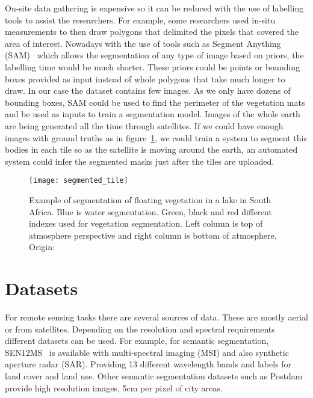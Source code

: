\documentclass[conference]{IEEEtran}
\begin{document}
    On-site data gathering is expensive so it can be reduced with the use of labelling tools to assist the researchers.
    For example, some researchers used in-situ measurements to then draw polygons that delimited the pixels that covered the area of interest.
    Nowadays with the use of tools such as Segment Anything (SAM)~\cite{kirillov2023segment} which allows the segmentation of any type of image based on priors, the labelling time would be much shorter.
    These priors could be points or bounding boxes provided as input instead of whole polygons that take much longer to draw.
    In our case the dataset contains few images.
    As we only have dozens of bounding boxes, SAM could be used to find the perimeter of the vegetation mats and be used as inputs to train a segmentation model.
    Images of the whole earth are being generated all the time through satellites.
    If we could have enough images with ground truths as in figure~\ref{fig:tile-segmented}, we could train a system to segment
    this bodies in each tile so as the satellite is moving around the earth, an automated system could infer the segmented masks just after the tiles are uploaded.

    \begin{figure}[h]
        \centering
        \texttt{[image: segmented\_tile]}
        \caption{Example of segmentation of floating vegetation in a lake in South Africa. Blue is water segmentation. Green, black and red different indexes used for vegetation segmentation.
        Left column is top of atmosphere perspective and right column is bottom of atmosphere. Origin: ~\citet{rs12244021}}
        \label{fig:tile-segmented}
    \end{figure}


    \section{Datasets}\label{sec:dataset}
    For remote sensing tasks there are several sources of data.
    These are mostly aerial or from satellites.
    Depending on the resolution and spectral requirements different datasets can be used.
    For example, for semantic segmentation, SEN12MS~\cite{SEN12MS_dataset} is available with multi-spectral imaging (MSI)
    and also synthetic aperture radar (SAR).
    Providing 13 different wavelength bands and labels for land cover and land use.
    Other semantic segmentation datasets such as Postdam~\cite{postdam_dataset} provide high resolution images, 5cm per pixel of
    city areas.
\end{document}
